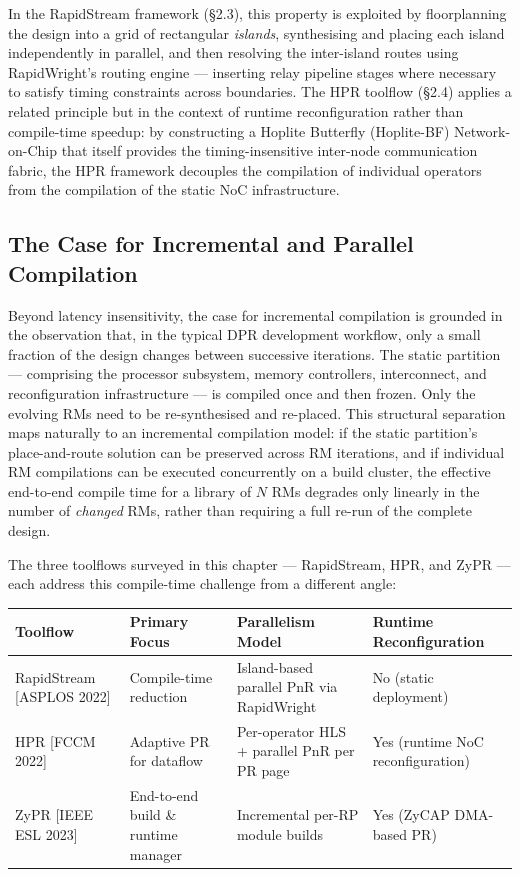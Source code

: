 In the RapidStream framework (§2.3), this property is exploited by floorplanning the design into a grid of rectangular \textit{islands}, synthesising and placing each island independently in parallel, and then resolving the inter-island routes using RapidWright's routing engine — inserting relay pipeline stages where necessary to satisfy timing constraints across boundaries. The HPR toolflow (§2.4) applies a related principle but in the context of runtime reconfiguration rather than compile-time speedup: by constructing a Hoplite Butterfly (Hoplite-BF) Network-on-Chip that itself provides the timing-insensitive inter-node communication fabric, the HPR framework decouples the compilation of individual operators from the compilation of the static NoC infrastructure.

\subsection{The Case for Incremental and Parallel Compilation}

Beyond latency insensitivity, the case for incremental compilation is grounded in the observation that, in the typical DPR development workflow, only a small fraction of the design changes between successive iterations. The static partition — comprising the processor subsystem, memory controllers, interconnect, and reconfiguration infrastructure — is compiled once and then frozen. Only the evolving RMs need to be re-synthesised and re-placed. This structural separation maps naturally to an incremental compilation model: if the static partition's place-and-route solution can be preserved across RM iterations, and if individual RM compilations can be executed concurrently on a build cluster, the effective end-to-end compile time for a library of $N$ RMs degrades only linearly in the number of \textit{changed} RMs, rather than requiring a full re-run of the complete design.

The three toolflows surveyed in this chapter — RapidStream, HPR, and ZyPR — each address this compile-time challenge from a different angle:

\begin{table}[htbp]
\centering
\begin{tabularx}{\textwidth}{p{2.5cm} X X X}
\toprule
Toolflow & Primary Focus & Parallelism Model & Runtime Reconfiguration \\
\midrule
RapidStream [ASPLOS 2022] & Compile-time reduction & Island-based parallel PnR via RapidWright & No (static deployment) \\
HPR [FCCM 2022] & Adaptive PR for dataflow & Per-operator HLS + parallel PnR per PR page & Yes (runtime NoC reconfiguration) \\
ZyPR [IEEE ESL 2023] & End-to-end build \& runtime manager & Incremental per-RP module builds & Yes (ZyCAP DMA-based PR) \\
\bottomrule
\end{tabularx}
\end{table}

